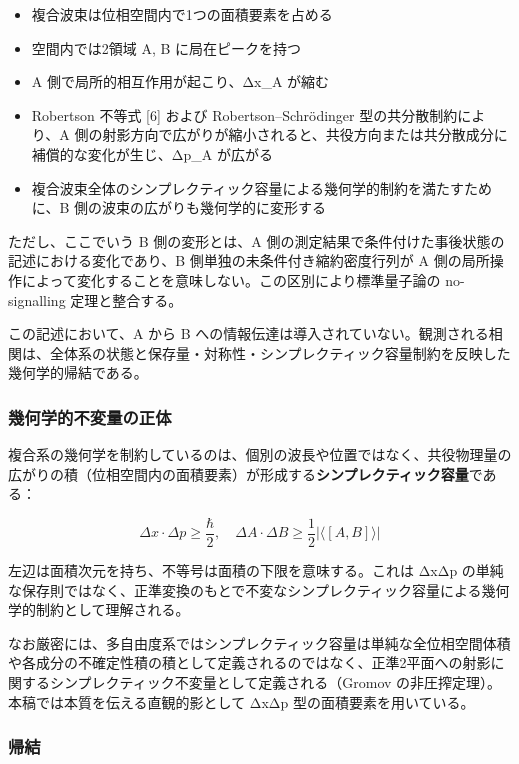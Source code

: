 \documentclass[
  11pt,
]{ltjsarticle}
\providecommand{\tightlist}{%
  \setlength{\itemsep}{0pt}\setlength{\parskip}{0pt}}
\begin{document}
\begin{itemize}
\tightlist
\item
  複合波束は位相空間内で1つの面積要素を占める
\item
  空間内では2領域 A, B に局在ピークを持つ
\item
  A 側で局所的相互作用が起こり、Δx\_A が縮む
\item
  Robertson 不等式 {[}6{]} および Robertson--Schrödinger
  型の共分散制約により、A
  側の射影方向で広がりが縮小されると、共役方向または共分散成分に補償的な変化が生じ、Δp\_A
  が広がる
\item
  複合波束全体のシンプレクティック容量による幾何学的制約を満たすために、B
  側の波束の広がりも幾何学的に変形する
\end{itemize}

ただし、ここでいう B 側の変形とは、A
側の測定結果で条件付けた事後状態の記述における変化であり、B
側単独の未条件付き縮約密度行列が A
側の局所操作によって変化することを意味しない。この区別により標準量子論の
no-signalling 定理と整合する。

この記述において、A から B
への情報伝達は導入されていない。観測される相関は、全体系の状態と保存量・対称性・シンプレクティック容量制約を反映した幾何学的帰結である。

\subsubsection{幾何学的不変量の正体}\label{ux5e7eux4f55ux5b66ux7684ux4e0dux5909ux91cfux306eux6b63ux4f53}

複合系の幾何学を制約しているのは、個別の波長や位置ではなく、共役物理量の広がりの積（位相空間内の面積要素）が形成する\textbf{シンプレクティック容量}である：

\[\Delta x \cdot \Delta p \geq \frac{\hbar}{2}, \quad \Delta A \cdot \Delta B \geq \frac{1}{2}\left|\langle [A,B] \rangle\right|\]

左辺は面積次元を持ち、不等号は面積の下限を意味する。これは ΔxΔp
の単純な保存則ではなく、正準変換のもとで不変なシンプレクティック容量による幾何学的制約として理解される。

なお厳密には、多自由度系ではシンプレクティック容量は単純な全位相空間体積や各成分の不確定性積の積として定義されるのではなく、正準2平面への射影に関するシンプレクティック不変量として定義される（Gromov
の非圧搾定理）。本稿では本質を伝える直観的影として ΔxΔp
型の面積要素を用いている。

\subsubsection{帰結}\label{ux5e30ux7d50-3}
\end{document}
